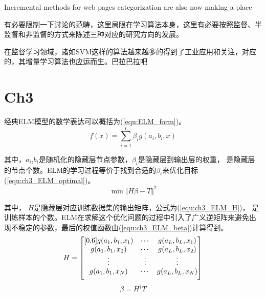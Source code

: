 Incremental methods for web pages categorization are also now making a place


有必要限制一下讨论的范畴，这里局限在学习算法本身，这里有必要按照监督、半监督和非监督的方式来陈述三种对应的研究方向的发展。

在监督学习领域，诸如SVM这样的算法越来越多的得到了工业应用和关注，对应的，其增量学习算法也应运而生。巴拉巴拉吧


%


%

\section{Ch3}
经典ELM模型的数学表达可以概括为(\ref{equ:ELM_form})。
\begin{equation}
\label{equ:ELM_form}
f(x)= \sum\limits_{i=1}^{L}\beta_i g(a_i, b_i, x)
\end{equation}


其中，$a_i$,$b_i$是随机化的隐藏层节点参数，$\beta_i$是隐藏层到输出层的权重， 是隐藏层的节点个数。ELM的学习过程等价于找到合适的$\beta_i$来优化目标(\ref{equ:ch3_ELM_optimal})。
\begin{equation}
\label{equ:ch3_ELM_optimal}
\min \Vert H\beta -T \Vert^2
\end{equation}

其中， $H$是隐藏层对应训练数据集的输出矩阵，公式为(\ref{equ:ch3_ELM_H})， 是训练样本的个数。ELM在求解这个优化问题的过程中引入了广义逆矩阵来避免出现不稳定的参数，最后的权值函数由(\ref{equ:ch3_ELM_beta})计算得到。
\begin{equation}
\label{equ:ch3_ELM_H}
H=\begin{bmatrix}[0.6]
g(a_1,b_1,x_1) & \cdots & g(a_L,b_L,x_1) \\
g(a_1,b_1,x_2) & \cdots & g(a_L,b_L,x_2) \\
\vdots & \vdots & \vdots \\
\vspace{5 pt}	%
g(a_1,b_1,x_N) & \cdots & g(a_L,b_L,x_N) \\
\end{bmatrix}
\end{equation}
\begin{equation}
\label{equ:ch3_ELM_beta}
\beta=H^{\dagger} T
\end{equation}


